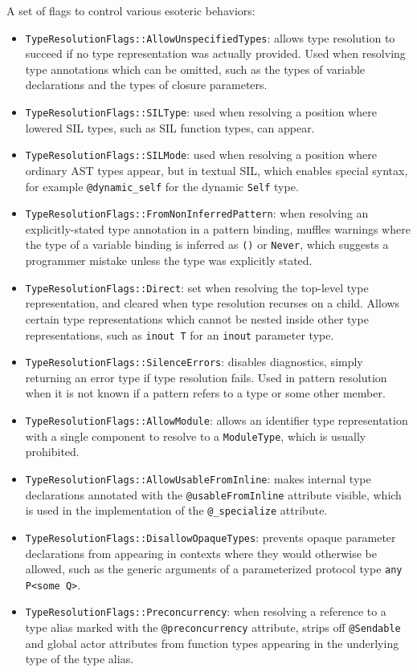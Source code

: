 \documentclass[../generics]{subfiles}
\begin{document}
A set of flags to control various esoteric behaviors:
\begin{itemize}
\item \texttt{TypeResolutionFlags::AllowUnspecifiedTypes}: allows type resolution to succeed if no type representation was actually provided. Used when resolving type annotations which can be omitted, such as the types of variable declarations and the types of closure parameters.
\item \texttt{TypeResolutionFlags::SILType}: used when resolving a position where lowered SIL types, such as SIL function types, can appear.
\item \texttt{TypeResolutionFlags::SILMode}: used when resolving a position where ordinary AST types appear, but in textual SIL, which enables special syntax, for example \texttt{@dynamic\_self} for the dynamic \texttt{Self} type.
\item \texttt{TypeResolutionFlags::FromNonInferredPattern}: when resolving an explicitly-stated type annotation in a pattern binding, muffles warnings where the type of a variable binding is inferred as \texttt{()} or \texttt{Never}, which suggests a programmer mistake unless the type was explicitly stated.
\item \texttt{TypeResolutionFlags::Direct}: set when resolving the top-level type representation, and cleared when type resolution recurses on a child. Allows certain type representations which cannot be nested inside other type representations, such as \texttt{inout T} for an \texttt{inout} parameter type.
\item \texttt{TypeResolutionFlags::SilenceErrors}: disables diagnostics, simply returning an error type if type resolution fails. Used in pattern resolution when it is not known if a pattern refers to a type or some other member.
\item \texttt{TypeResolutionFlags::AllowModule}: allows an identifier type representation with a single component to resolve to a \texttt{ModuleType}, which is usually prohibited.
\item \texttt{TypeResolutionFlags::AllowUsableFromInline}: makes internal type declarations annotated with the \texttt{@usableFromInline} attribute visible, which is used in the implementation of the \texttt{@\_specialize} attribute.
\item \texttt{TypeResolutionFlags::DisallowOpaqueTypes}: prevents opaque parameter declarations from appearing in contexts where they would otherwise be allowed, such as the generic arguments of a parameterized protocol type \verb|any P<some Q>|.
\item \texttt{TypeResolutionFlags::Preconcurrency}: when resolving a reference to a type alias marked with the \texttt{@preconcurrency} attribute, strips off \texttt{@Sendable} and global actor attributes from function types appearing in the underlying type of the type alias.
\end{itemize}
\end{document}
